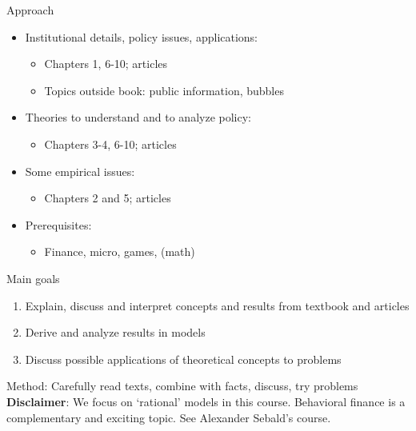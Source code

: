 \begin{frame}{Approach}
\begin{itemize}
	\item Institutional details, policy issues, applications:
	\begin{itemize}
		\item Chapters 1, 6-10; articles
		\item Topics outside book: public information, bubbles
	\end{itemize}
	\item Theories to understand and to analyze policy:
	\begin{itemize}
		\item Chapters 3-4, 6-10; articles
	\end{itemize}
	\item Some empirical issues:
	\begin{itemize}
		\item Chapters 2 and 5; articles
	\end{itemize}
	\item Prerequisites:
	\begin{itemize}
		\item Finance, micro, games, (math)
	\end{itemize}
\end{itemize}
\end{frame}


\begin{frame}{Main goals}
\begin{enumerate}
	\item Explain, discuss and interpret concepts and results from textbook and articles
	\item Derive and analyze results in models
	\item Discuss possible applications of theoretical concepts to problems
\end{enumerate}
Method: Carefully read texts, combine with facts, discuss, try problems
\pause
\quad
\textbf{Disclaimer}: We focus on `rational' models in this course.
Behavioral finance is a complementary and exciting topic. See
Alexander Sebald's course.
\end{frame}


